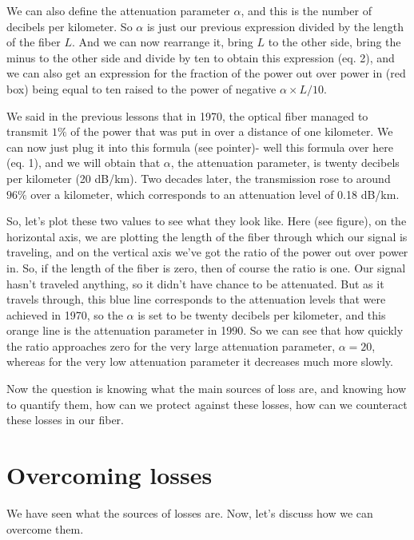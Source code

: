 We can also define the attenuation parameter $\alpha$, and this is the number of decibels per kilometer. So $\alpha$ is just our previous expression divided by the length of the fiber $L$. And we can now rearrange it, bring $L$ to the other side, bring the minus to the other side and divide by ten to obtain this expression (eq. 2), and we can also get an expression for the fraction of the power out over power in (red box) being equal to ten raised to the power of negative $\alpha \times L / 10$.

We said in the previous lessons that in 1970, the optical fiber managed to transmit $1\%$ of the power that was put in over a distance of one kilometer. We can now just plug it into this formula (see pointer)- well this formula over here (eq. 1), and we will obtain that $\alpha$, the attenuation parameter, is twenty decibels per kilometer (20 dB/km). Two decades later, the transmission rose to around $96\%$ over a kilometer, which corresponds to an attenuation level of 0.18 dB/km.

So, let's plot these two values to see what they look like. Here (see figure), on the horizontal axis, we are plotting the length of the fiber through which our signal is traveling, and on the vertical axis we've got the ratio of the power out over power in. So, if the length of the fiber is zero, then of course the ratio is one. Our signal hasn't traveled anything, so it didn't have chance to be attenuated. But as it travels through, this blue line corresponds to the attenuation levels that were achieved in 1970, so the $\alpha$ is set to be twenty decibels per kilometer, and this orange line is the attenuation parameter in 1990. So we can see that how quickly the ratio approaches zero for the very large attenuation parameter, $\alpha = 20$, whereas for the very low attenuation parameter it decreases much more slowly.

Now the question is knowing what the main sources of loss are, and knowing how to quantify them, how can we protect against these losses, how can we counteract these losses in our fiber.



\section{Overcoming losses}
\label{sec:11-4_overcoming_losses}

We have seen what the sources of losses are. Now, let's discuss how we can overcome them.

